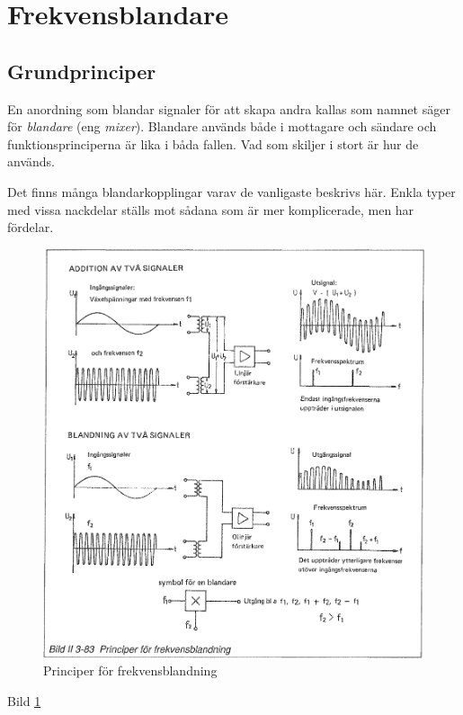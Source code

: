 \section{Frekvensblandare}
\label{blandare}

\subsection{Grundprinciper}

En anordning som blandar signaler för att skapa andra kallas som
namnet säger för \emph{blandare} (eng \emph{mixer}). Blandare används både i mottagare och
sändare och funktionsprinciperna är lika i båda fallen. Vad som
skiljer i stort är hur de används.

Det finns många blandarkopplingar varav de vanligaste beskrivs
här. Enkla typer med vissa nackdelar ställs mot sådana som är mer
komplicerade, men har fördelar.

\begin{figure}
\includegraphics[width=\textwidth]{images/bild_2_3-83}
\caption{Principer för frekvensblandning}
\label{fig:BildII3-83}
\end{figure}

Bild \ref{fig:BildII3-83}

